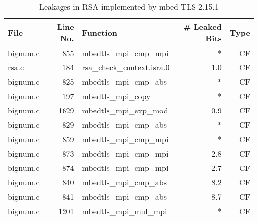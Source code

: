 \begin{table}[h!]
\centering\tiny\scriptsize
\caption{Leakages in RSA implemented by mbed TLS 2.15.1}\label{tab:RSAmbed TLS2.15.1}
\begin{tabular}{lrlrr}
\hline
\textbf{File} & \textbf{Line No.} & \textbf{Function} & \textbf{\# Leaked Bits} & \textbf{Type} \\\hline
bignum.c& 855&mbedtls\_mpi\_cmp\_mpi&*&CF\\
rsa.c& 184&rsa\_check\_context.isra.0&1.0 &CF\\
bignum.c& 825&mbedtls\_mpi\_cmp\_abs&*&CF\\
bignum.c& 197&mbedtls\_mpi\_copy&*&CF\\
bignum.c& 1629&mbedtls\_mpi\_exp\_mod&0.9 &CF\\
bignum.c& 829&mbedtls\_mpi\_cmp\_abs&*&CF\\
bignum.c& 859&mbedtls\_mpi\_cmp\_mpi&*&CF\\
bignum.c& 873&mbedtls\_mpi\_cmp\_mpi&2.8 &CF\\
bignum.c& 874&mbedtls\_mpi\_cmp\_mpi&2.7 &CF\\
bignum.c& 840&mbedtls\_mpi\_cmp\_abs&8.2 &CF\\
bignum.c& 841&mbedtls\_mpi\_cmp\_abs&8.7 &CF\\
bignum.c& 1201&mbedtls\_mpi\_mul\_mpi&*&CF\\
\hline
\end{tabular}
\renewcommand{\baselinestretch}{1.0}\selectfont
\end{table}

